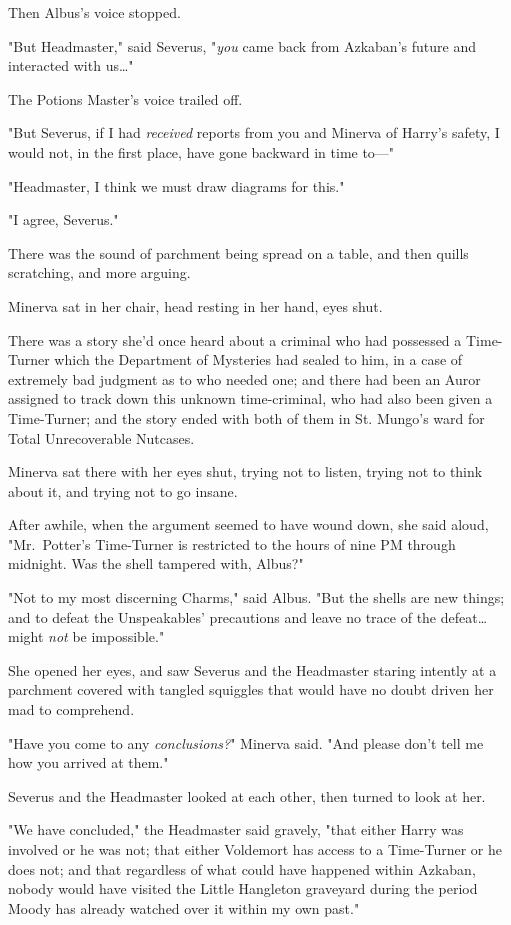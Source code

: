 Then Albus's voice stopped.

"But Headmaster," said Severus, "\emph{you} came back from Azkaban's future and
interacted with us{\ldots}"

The Potions Master's voice trailed off.

"But Severus, if I had \emph{received} reports from you and Minerva of Harry's
safety, I would not, in the first place, have gone backward in time to---"

"Headmaster, I think we must draw diagrams for this."

"I agree, Severus."

There was the sound of parchment being spread on a table, and then quills
scratching, and more arguing.

Minerva sat in her chair, head resting in her hand, eyes shut.

There was a story she'd once heard about a criminal who had possessed a
Time-Turner which the Department of Mysteries had sealed to him, in a case of
extremely bad judgment as to who needed one; and there had been an Auror
assigned to track down this unknown time-criminal, who had also been given a
Time-Turner; and the story ended with both of them in St. Mungo's ward for
Total Unrecoverable Nutcases.

Minerva sat there with her eyes shut, trying not to listen, trying not to think
about it, and trying not to go insane.

After awhile, when the argument seemed to have wound down, she said aloud,
"Mr.~Potter's Time-Turner is restricted to the hours of nine PM through
midnight. Was the shell tampered with, Albus?"

"Not to my most discerning Charms," said Albus. "But the shells are new things;
and to defeat the Unspeakables' precautions and leave no trace of the
defeat{\ldots} might \emph{not} be impossible."

She opened her eyes, and saw Severus and the Headmaster staring intently at a
parchment covered with tangled squiggles that would have no doubt driven her
mad to comprehend.

"Have you come to any \emph{conclusions?}" Minerva said. "And please don't tell
me how you arrived at them."

Severus and the Headmaster looked at each other, then turned to look at her.

"We have concluded," the Headmaster said gravely, "that either Harry was
involved or he was not; that either Voldemort has access to a Time-Turner or he
does not; and that regardless of what could have happened within Azkaban,
nobody would have visited the Little Hangleton graveyard during the period
Moody has already watched over it within my own past."

